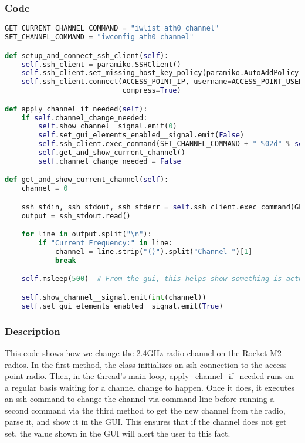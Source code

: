 \subsubsection{Code}
\begin{lstlisting}[language=python]
GET_CURRENT_CHANNEL_COMMAND = "iwlist ath0 channel"
SET_CHANNEL_COMMAND = "iwconfig ath0 channel"

def setup_and_connect_ssh_client(self):
    self.ssh_client = paramiko.SSHClient()
    self.ssh_client.set_missing_host_key_policy(paramiko.AutoAddPolicy())
    self.ssh_client.connect(ACCESS_POINT_IP, username=ACCESS_POINT_USER, password=ACCESS_POINT_PASSWORD,
                            compress=True)

def apply_channel_if_needed(self):
    if self.channel_change_needed:
        self.show_channel__signal.emit(0)
        self.set_gui_elements_enabled__signal.emit(False)
        self.ssh_client.exec_command(SET_CHANNEL_COMMAND + " %02d" % self.new_channel)
        self.get_and_show_current_channel()
        self.channel_change_needed = False

def get_and_show_current_channel(self):
    channel = 0

    ssh_stdin, ssh_stdout, ssh_stderr = self.ssh_client.exec_command(GET_CURRENT_CHANNEL_COMMAND)
    output = ssh_stdout.read()

    for line in output.split("\n"):
        if "Current Frequency:" in line:
            channel = line.strip("()").split("Channel ")[1]
            break

    self.msleep(500)  # From the gui, this helps show something is actually happening

    self.show_channel__signal.emit(int(channel))
    self.set_gui_elements_enabled__signal.emit(True)
\end{lstlisting}
\subsubsection{Description}
This code shows how we change the 2.4GHz radio channel on the Rocket M2 radios. In the first method, the class initializes an ssh connection to the access point radio. Then, in the thread's main loop, apply\_channel\_if\_needed runs on a regular basis waiting for a channel change to happen. Once it does, it executes an ssh command to change the channel via command line before running a second command via the third method to get the new channel from the radio, parse it, and show it in the GUI. This ensures that if the channel does not get set, the value shown in the GUI will alert the user to this fact.

